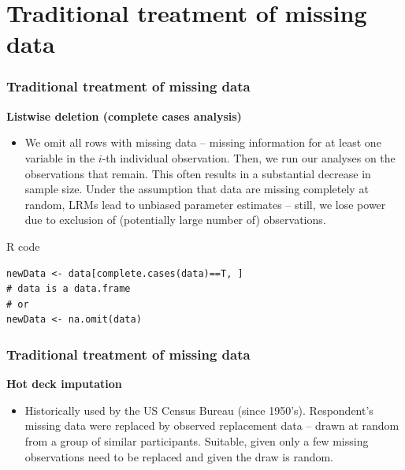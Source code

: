 \documentclass{beamer}
\begin{document}
\section{Traditional treatment of missing data}
\begin{frame}[fragile] %
\frametitle{Traditional treatment of missing data}


\textbf{Listwise deletion (complete cases analysis)}
\vspace{0.2cm}
  \begin{itemize}
  \item  We omit all rows with missing data – missing information for at least one variable in the $i$-th individual observation. Then, we run our analyses on the observations that remain. This often results in a substantial decrease in sample size. Under the assumption that data are missing completely at random, LRMs lead to unbiased parameter estimates – still, we lose power due to exclusion of (potentially large number of) observations.
  \end{itemize} 

\begin{block}{R code}
\begin{verbatim}
newData <- data[complete.cases(data)==T, ] 
# data is a data.frame
# or
newData <- na.omit(data) 
\end{verbatim}
\end{block}

\end{frame}


\begin{frame}
\frametitle{Traditional treatment of missing data}


\textbf{Hot deck imputation}
\vspace{0.2cm}
  \begin{itemize}
  \item  Historically used by the US Census Bureau (since 1950’s). Respondent’s missing data were replaced by observed replacement data – drawn at random from a group of similar participants. Suitable, given only a few missing observations need to be replaced and given the draw is random.
  \end{itemize} 

\end{frame}


\end{document}
